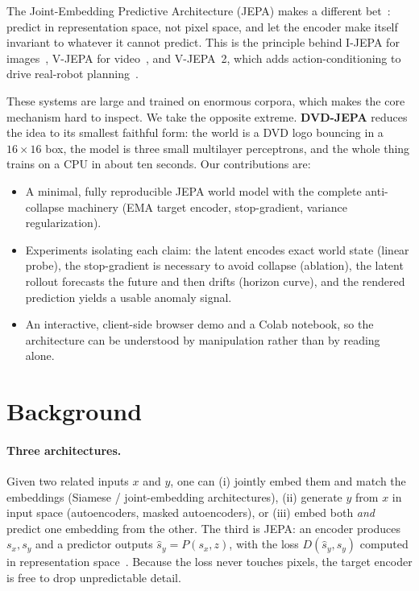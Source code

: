 \documentclass[11pt]{article}
\begin{document}
The Joint-Embedding Predictive Architecture (JEPA) makes a different bet~\cite{lecun2022,assran2023}:
predict in representation space, not pixel space, and let the encoder make itself invariant to whatever
it cannot predict. This is the principle behind I-JEPA for images~\cite{assran2023}, V-JEPA for
video~\cite{bardes2024}, and V-JEPA~2, which adds action-conditioning to drive real-robot
planning~\cite{vjepa2}.

These systems are large and trained on enormous corpora, which makes the core mechanism hard to inspect.
We take the opposite extreme. \textbf{DVD-JEPA} reduces the idea to its smallest faithful form: the world
is a DVD logo bouncing in a $16\times16$ box, the model is three small multilayer perceptrons, and the
whole thing trains on a CPU in about ten seconds. Our contributions are:
\begin{itemize}\setlength\itemsep{1pt}
  \item A minimal, fully reproducible JEPA world model with the complete anti-collapse machinery
  (EMA target encoder, stop-gradient, variance regularization).
  \item Experiments isolating each claim: the latent encodes exact world state (linear probe), the
  stop-gradient is necessary to avoid collapse (ablation), the latent rollout forecasts the future and
  then drifts (horizon curve), and the rendered prediction yields a usable anomaly signal.
  \item An interactive, client-side browser demo and a Colab notebook, so the architecture can be
  understood by manipulation rather than by reading alone.
\end{itemize}

\section{Background}
\label{sec:bg}
\paragraph{Three architectures.} Given two related inputs $x$ and $y$, one can (i) jointly embed them and
match the embeddings (Siamese / joint-embedding architectures), (ii) generate $y$ from $x$ in input space
(autoencoders, masked autoencoders), or (iii) embed both \emph{and} predict one embedding from the other.
The third is JEPA: an encoder produces $s_x,s_y$ and a predictor outputs $\hat s_y = P(s_x,z)$, with the
loss $D(\hat s_y, s_y)$ computed in representation space~\cite{lecun2022}. Because the loss never touches
pixels, the target encoder is free to drop unpredictable detail.
\end{document}
